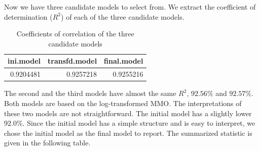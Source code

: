 \documentclass[
]{book}
\newenvironment{Shaded}{\begin{snugshade}}{\end{snugshade}}
\newcommand{\AttributeTok}[1]{\textcolor[rgb]{0.13,0.29,0.53}{#1}}
\newcommand{\DocumentationTok}[1]{\textcolor[rgb]{0.56,0.35,0.01}{\textbf{\textit{#1}}}}
\newcommand{\FunctionTok}[1]{\textcolor[rgb]{0.13,0.29,0.53}{\textbf{#1}}}
\newcommand{\NormalTok}[1]{#1}
\newcommand{\OtherTok}[1]{\textcolor[rgb]{0.56,0.35,0.01}{#1}}
\newcommand{\SpecialCharTok}[1]{\textcolor[rgb]{0.81,0.36,0.00}{\textbf{#1}}}
\newcommand{\StringTok}[1]{\textcolor[rgb]{0.31,0.60,0.02}{#1}}
\begin{document}
Now we have three candidate models to select from. We extract the coefficient of determination (\(R^2\)) of each of the three candidate models.

\begin{Shaded}
\end{Shaded}

\begin{table}

\caption{\label{tab:unnamed-chunk-164}Coefficients of correlation of the three candidate models}
\centering
\begin{tabular}[t]{r|r|r}
\hline
ini.model & transfd.model & final.model\\
\hline
0.9204481 & 0.9257218 & 0.9255216\\
\hline
\end{tabular}
\end{table}

The second and the third models have almost the same \(R^2\), \(92.56\%\) and \(92.57\%\). Both models are based on the log-transformed MMO. The interpretations of these two models are not straightforward. The initial model has a slightly lower \(92.0\%\). Since the initial model has a simple structure and is easy to interpret, we chose the initial model as the final model to report. The summarized statistic is given in the following table.

\begin{Shaded}
\end{Shaded}
\end{document}

